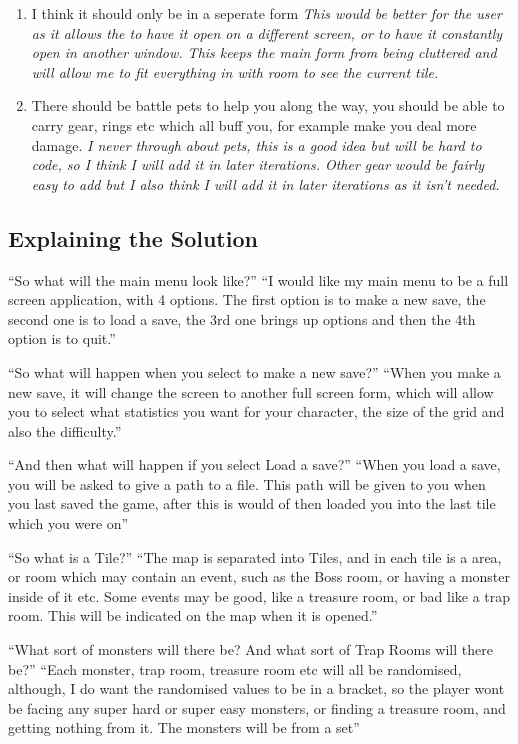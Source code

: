 \documentclass[14pt]{article}
\begin{document}
\begin{enumerate}
	\item{I think it should only be in a seperate form}
	\em{This would be better for the user as it allows the to have it open on a different screen, or to have it constantly open in another window. This keeps the main form from being cluttered and will allow me to fit everything in with room to see the current tile.}
	
	\item{There should be battle pets to help you along the way, you should be able to carry gear, rings etc which all buff you, for example make you deal more damage.}
	\em{I never through about pets, this is a good idea but will be hard to code, so I think I will add it in later iterations. Other gear would be fairly easy to add but I also think I will add it in later iterations as it isn't needed.}
\end{enumerate}
			
		\subsection{Explaining the Solution}

“So what will the main menu look like?”
“I would like my main menu to be a full screen application, with 4 options. The first option is to make a new save, the second one is to load a save, the 3rd one brings up options and then the 4th option is to quit.”

“So what will happen when you select to make a new save?”
“When you make a new save, it will change the screen to another full screen form, which will allow you to select what statistics you want for your character, the size of the grid and also the difficulty.”

“And then what will happen if you select Load a save?”
“When you load a save, you will be asked to give a path to a file. This path will be given to you when you last saved the game, after this is would of then loaded you into the last tile which you were on”

“So what is a Tile?”
“The map is separated into Tiles, and in each tile is a area, or room which may contain an event, such as the Boss room, or having a monster inside of it etc. Some events may be good, like a treasure room, or bad like a trap room. This will be indicated on the map when it is opened.”

“What sort of monsters will there be? And what sort of Trap Rooms will there be?”
“Each monster, trap room, treasure room etc will all be randomised, although, I do want the randomised values to be in a bracket, so the player wont be facing any super hard or super easy monsters, or finding a treasure room, and getting nothing from it. The monsters will be from a set”
\end{document}
